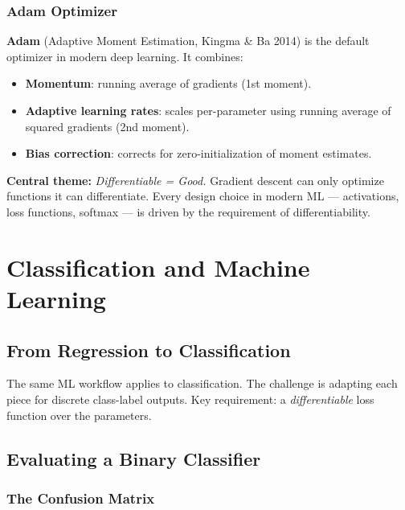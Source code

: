 \documentclass[11pt]{article}
\begin{document}
\subsubsection{Adam Optimizer}

\textbf{Adam} (Adaptive Moment Estimation, Kingma \& Ba 2014) is the default optimizer in modern deep learning. It combines:
\begin{itemize}
  \item \textbf{Momentum}: running average of gradients (1st moment).
  \item \textbf{Adaptive learning rates}: scales per-parameter using running average of squared gradients (2nd moment).
  \item \textbf{Bias correction}: corrects for zero-initialization of moment estimates.
\end{itemize}

\begin{takeawaybox}
\textbf{Central theme:} \textit{Differentiable = Good.} Gradient descent can only optimize functions it can differentiate. Every design choice in modern ML --- activations, loss functions, softmax --- is driven by the requirement of differentiability.
\end{takeawaybox}

\section{Classification and Machine Learning}

\subsection{From Regression to Classification}

The same ML workflow applies to classification. The challenge is adapting each piece for discrete class-label outputs. Key requirement: a \emph{differentiable} loss function over the parameters.

\subsection{Evaluating a Binary Classifier}

\subsubsection{The Confusion Matrix}
\end{document}
